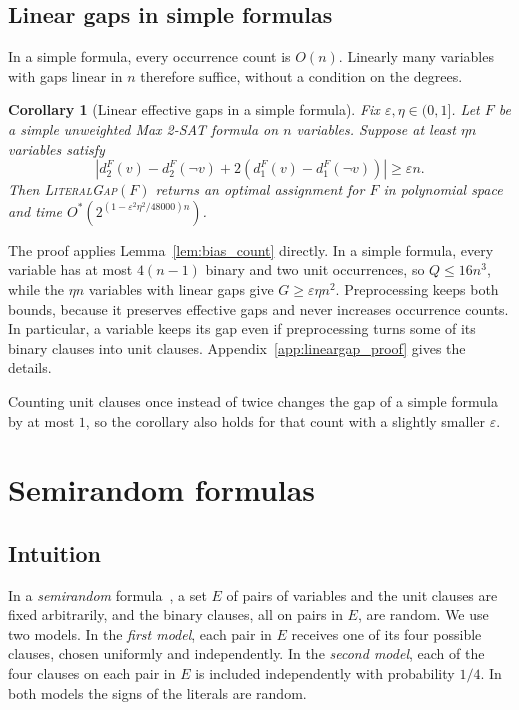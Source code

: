 \documentclass[11pt,a4paper]{article}
\newtheorem{corollary}[theorem]{Corollary}
\theoremstyle{definition}
\theoremstyle{remark}
\newcommand{\Ostar}{O^{*}}
\begin{document}
\subsection{Linear gaps in simple formulas}

In a simple formula, every occurrence count is $O(n)$. Linearly many
variables with gaps linear in $n$ therefore suffice, without a condition on
the degrees.

\begin{corollary}[Linear effective gaps in a simple formula]\label{cor:lineargap}
Fix $\varepsilon,\eta\in(0,1]$. Let $F$ be a simple unweighted Max 2-SAT
formula on $n$ variables. Suppose at least $\eta n$ variables satisfy
\[
 |d_2^F(v)-d_2^F(\neg v)+2(d_1^F(v)-d_1^F(\neg v))|
 \ge\varepsilon n.
\]
Then \textnormal{\textsc{LiteralGap}}$(F)$ returns an optimal assignment for
$F$ in polynomial space and time
$\Ostar(2^{(1-\varepsilon^2\eta^2/48000)n})$.
\end{corollary}

The proof applies Lemma~\ref{lem:bias_count} directly. In a simple
formula, every variable has at most $4(n-1)$ binary and two unit
occurrences, so $Q\le16n^3$, while the $\eta n$ variables with linear
gaps give $G\ge\varepsilon\eta n^2$. Preprocessing keeps both bounds,
because it preserves effective gaps and never increases occurrence
counts. In particular, a variable keeps its gap even if preprocessing
turns some of its binary clauses into unit clauses.
Appendix~\ref{app:lineargap_proof} gives the details.

Counting unit clauses once instead of twice changes the gap of a simple
formula by at most $1$, so the corollary also holds for that count with a
slightly smaller $\varepsilon$.

\section{Semirandom formulas}\label{sec:random}

\subsection{Intuition}\label{sec:random_intuition}

In a \emph{semirandom} formula~\cite{feige2007refuting}, a set $E$ of pairs
of variables and the unit clauses are fixed arbitrarily, and the binary
clauses, all on pairs in $E$, are random. We use two models. In the
\emph{first model}, each pair in $E$ receives one of its four possible
clauses, chosen uniformly and independently. In the \emph{second model},
each of the four clauses on each pair in $E$ is included independently
with probability $1/4$. In both models the signs of the literals are
random.
\end{document}
